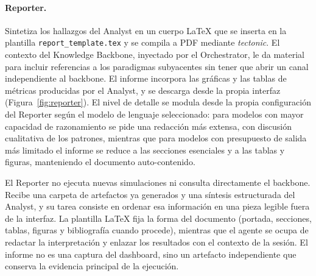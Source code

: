 \paragraph{Reporter.} Sintetiza los hallazgos del Analyst en un cuerpo
LaTeX que se inserta en la plantilla \texttt{report\_template.tex} y se
compila a PDF mediante \textit{tectonic}. El
contexto del Knowledge Backbone, inyectado por el Orchestrator, le da material
para incluir referencias a los paradigmas subyacentes sin tener que
abrir un canal independiente al backbone. El informe incorpora las
gráficas y las tablas de métricas producidas por el Analyst, y se descarga
desde la propia interfaz (Figura~\ref{fig:reporter}).
El nivel de detalle se modula desde la propia configuración del
Reporter según el modelo de lenguaje seleccionado: para modelos
con mayor capacidad de razonamiento se pide una redacción más extensa,
con discusión cualitativa de los patrones, mientras que para modelos
con presupuesto de salida más limitado el informe se reduce a las
secciones esenciales y a las tablas y figuras, manteniendo el documento
auto-contenido.

El Reporter no ejecuta nuevas simulaciones ni consulta directamente el
backbone. Recibe una carpeta de artefactos ya generados y una síntesis
estructurada del Analyst, y su tarea consiste en ordenar esa información
en una pieza legible fuera de la interfaz. La plantilla LaTeX fija la
forma del documento (portada, secciones, tablas, figuras y bibliografía
cuando procede), mientras que el agente se ocupa de redactar la
interpretación y enlazar los resultados con el contexto de la sesión. El
informe no es una captura del dashboard, sino un artefacto independiente
que conserva la evidencia principal de la ejecución.

